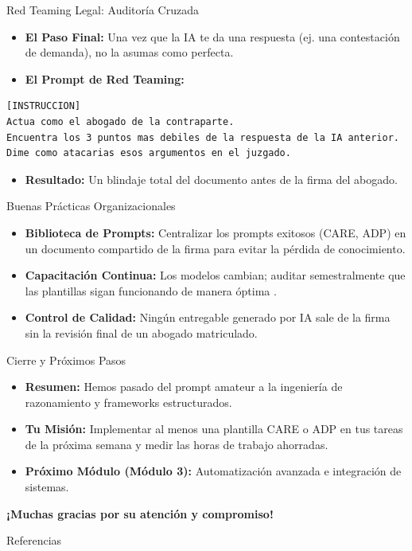 \documentclass[aspectratio=169]{beamer}
\begin{document}
\begin{frame}[fragile]{Red Teaming Legal: Auditoría Cruzada}


\begin{itemize}
  \item \textbf{El Paso Final:} Una vez que la IA te da una respuesta (ej. una contestación de demanda), no la asumas como perfecta.
  \item \textbf{El Prompt de Red Teaming:}
\end{itemize}
\begin{lstlisting}[basicstyle=\ttfamily\scriptsize]
[INSTRUCCION]
Actua como el abogado de la contraparte.
Encuentra los 3 puntos mas debiles de la respuesta de la IA anterior.
Dime como atacarias esos argumentos en el juzgado.
\end{lstlisting}
\begin{itemize}
  \item \textbf{Resultado:} Un blindaje total del documento antes de la firma del abogado.
\end{itemize}
\end{frame}



\begin{frame}[fragile]{Buenas Prácticas Organizacionales}


\begin{itemize}
  \item \textbf{Biblioteca de Prompts:} Centralizar los prompts exitosos (CARE, ADP) en un documento compartido de la firma para evitar la pérdida de conocimiento.
  \item \textbf{Capacitación Continua:} Los modelos cambian; auditar semestralmente que las plantillas sigan funcionando de manera óptima \cite{sal2024}.
  \item \textbf{Control de Calidad:} Ningún entregable generado por IA sale de la firma sin la revisión final de un abogado matriculado.
\end{itemize}
\end{frame}



\begin{frame}[fragile]{Cierre y Próximos Pasos}


\begin{itemize}
  \item \textbf{Resumen:} Hemos pasado del prompt amateur a la ingeniería de razonamiento y frameworks estructurados.
  \item \textbf{Tu Misión:} Implementar al menos una plantilla CARE o ADP en tus tareas de la próxima semana y medir las horas de trabajo ahorradas.
  \item \textbf{Próximo Módulo (Módulo 3):} Automatización avanzada e integración de sistemas.
\end{itemize}
\textbf{¡Muchas gracias por su atención y compromiso!}

\end{frame}




\begin{frame}[allowframebreaks]{Referencias}
  
  
\end{frame}
\end{document}
